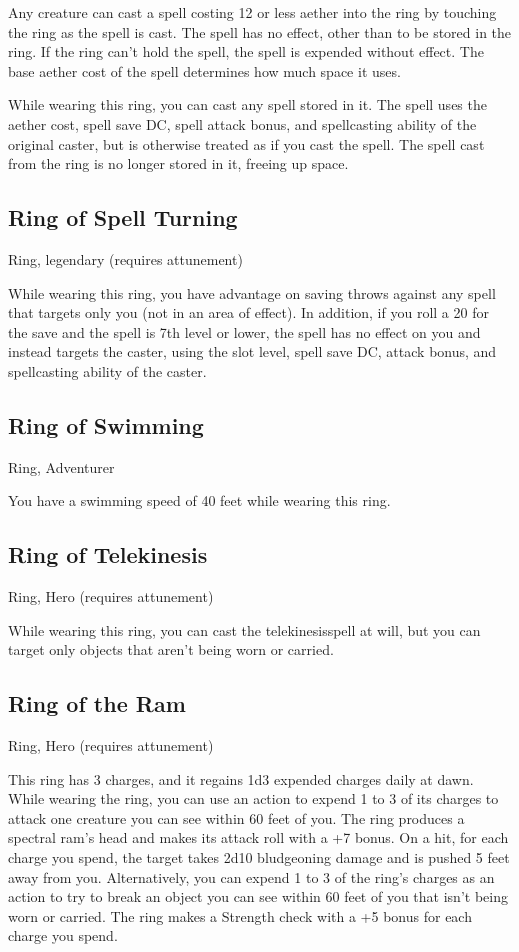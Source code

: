 Any creature can cast a spell costing 12 or less aether into the ring by touching the ring as the spell is cast. The spell has no effect, other than to be stored in the ring. If the ring can't hold the spell, the spell is expended without effect. The base aether cost of the spell determines how much space it uses.

While wearing this ring, you can cast any spell stored in it. The spell uses the aether cost, spell save DC, spell attack bonus, and spellcasting ability of the original caster, but is otherwise treated as if you cast the spell. The spell cast from the ring is no longer stored in it, freeing up space.

\subsection{Ring of Spell Turning}
Ring, legendary (requires attunement)

While wearing this ring, you have advantage on saving throws against any spell that targets only you (not in an area of effect). In addition, if you roll a 20 for the save and the spell is 7th level or lower, the spell has no effect on you and instead targets the caster, using the slot level, spell save DC, attack bonus, and spellcasting ability of the caster.

\subsection{Ring of Swimming}
Ring, Adventurer 

You have a swimming speed of 40 feet while wearing this ring.

\subsection{Ring of Telekinesis}
Ring, Hero (requires attunement) 

While wearing this ring, you can cast the telekinesisspell at will, but you can target only objects that aren't being worn or carried.

\subsection{Ring of the Ram}
Ring, Hero (requires attunement) 

This ring has 3 charges, and it regains 1d3 expended charges daily at dawn. While wearing the ring, you can use an action to expend 1 to 3 of its charges to attack one creature you can see within 60 feet of you. The ring produces a spectral ram's head and makes its attack roll with a +7 bonus. On a hit, for each charge you spend, the target takes 2d10 bludgeoning damage and is pushed 5 feet away from you.  Alternatively, you can expend 1 to 3 of the ring's charges as an action to try to break an object you can see within 60 feet of you that isn't being worn or carried. The ring makes a Strength check with a +5 bonus for each charge you spend.

